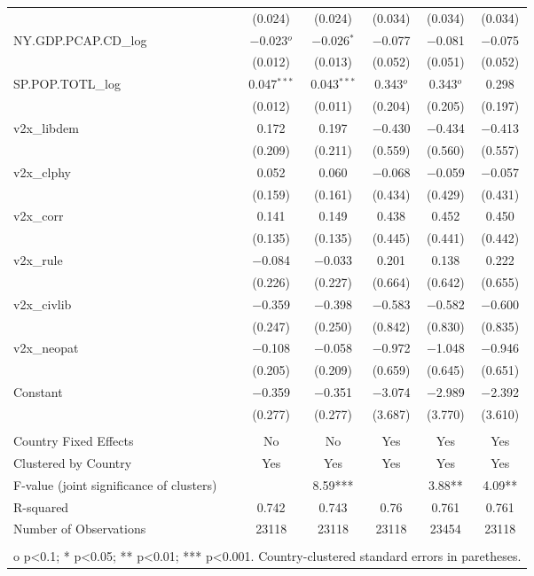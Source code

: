 \documentclass{article}
\begin{document}
\begin{table}[htbp]
{\begin{tabular}{@{\extracolsep{5pt}}lccccc}
  & (0.024) & (0.024) & (0.034) & (0.034) & (0.034) \\ 
  NY.GDP.PCAP.CD\_log & $-$0.023$^{o}$ & $-$0.026$^{*}$ & $-$0.077 & $-$0.081 & $-$0.075 \\ 
  & (0.012) & (0.013) & (0.052) & (0.051) & (0.052) \\ 
  SP.POP.TOTL\_log & 0.047$^{***}$ & 0.043$^{***}$ & 0.343$^{o}$ & 0.343$^{o}$ & 0.298 \\ 
  & (0.012) & (0.011) & (0.204) & (0.205) & (0.197) \\ 
  v2x\_libdem & 0.172 & 0.197 & $-$0.430 & $-$0.434 & $-$0.413 \\ 
  & (0.209) & (0.211) & (0.559) & (0.560) & (0.557) \\ 
  v2x\_clphy & 0.052 & 0.060 & $-$0.068 & $-$0.059 & $-$0.057 \\ 
  & (0.159) & (0.161) & (0.434) & (0.429) & (0.431) \\ 
  v2x\_corr & 0.141 & 0.149 & 0.438 & 0.452 & 0.450 \\ 
  & (0.135) & (0.135) & (0.445) & (0.441) & (0.442) \\ 
  v2x\_rule & $-$0.084 & $-$0.033 & 0.201 & 0.138 & 0.222 \\ 
  & (0.226) & (0.227) & (0.664) & (0.642) & (0.655) \\ 
  v2x\_civlib & $-$0.359 & $-$0.398 & $-$0.583 & $-$0.582 & $-$0.600 \\ 
  & (0.247) & (0.250) & (0.842) & (0.830) & (0.835) \\ 
  v2x\_neopat & $-$0.108 & $-$0.058 & $-$0.972 & $-$1.048 & $-$0.946 \\ 
  & (0.205) & (0.209) & (0.659) & (0.645) & (0.651) \\ 
  Constant & $-$0.359 & $-$0.351 & $-$3.074 & $-$2.989 & $-$2.392 \\ 
  & (0.277) & (0.277) & (3.687) & (3.770) & (3.610) \\ 
 \hline \\[-1.8ex] 
Country Fixed Effects & No & No & Yes & Yes & Yes \\ 
Clustered by Country & Yes & Yes & Yes & Yes & Yes \\ 
F-value (joint significance of clusters) &  & 8.59*** &  & 3.88** & 4.09** \\ 
R-squared & 0.742 & 0.743 & 0.76 & 0.761 & 0.761 \\ 
Number of Observations & 23118 & 23118 & 23118 & 23454 & 23118 \\ 
\hline 
\hline \\[-1.8ex] 
\multicolumn{6}{l}{\parbox{17cm}{o p<0.1; * p<0.05; ** p<0.01; *** p<0.001. Country-clustered standard errors in paretheses.}} \\ 
\end{tabular} 
}

\end{table}
\end{document}
